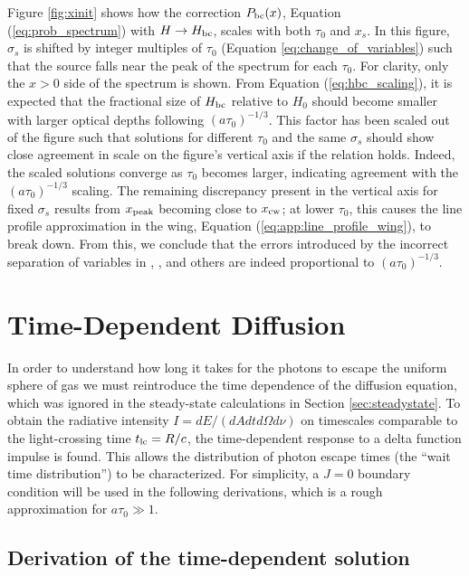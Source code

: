 \documentclass[linenumbers]{aastex63}
\begin{document}
Figure \ref{fig:xinit} shows how the correction $P_{\rm bc}(x)$, Equation (\ref{eq:prob_spectrum}) with $H \rightarrow H_{\rm bc}$, scales with both $\tau_0$ and $x_s$. In this figure, $\sigma_s$ is shifted by integer multiples of $\tau_0$ (Equation \ref{eq:change_of_variables}) such that the source falls near the peak of the spectrum for each $\tau_0$. For clarity, only the $x > 0$ side of the spectrum is shown. From Equation (\ref{eq:hbc_scaling}), it is expected that the fractional size of $H_{\rm bc}$ relative to $H_0$ should become smaller with larger optical depths following $(a\tau_0)^{-1/3}$. This factor has been scaled out of the figure such that solutions for different $\tau_0$ and the same $\sigma_s$ should show close agreement in scale on the figure's vertical axis if the relation holds. Indeed, the scaled solutions converge as $\tau_0$ becomes larger, indicating agreement with the $(a\tau_0)^{-1/3}$ scaling. The remaining discrepancy present in the vertical axis for fixed $\sigma_s$ results from $x_{\rm peak}$ becoming close to $x_{\rm cw}$; at lower $\tau_0$, this causes the line profile approximation in the wing, Equation (\ref{eq:app:line_profile_wing}), to break down. From this, we conclude that the errors introduced by the incorrect separation of variables in \citet{1973MNRAS.162...43H}, \citet{1990ApJ...350..216N}, \citet{2006ApJ...649...14D} and others are indeed proportional to $(a\tau_0)^{-1/3}$.

\section{Time-Dependent Diffusion}
\label{sec:time_dependent}

In order to understand how long it takes for the photons to escape the uniform sphere of gas we must reintroduce the time dependence of the diffusion equation, which was ignored in the steady-state calculations in Section \ref{sec:steadystate}. To obtain the radiative intensity $I=dE/(dAdtd\Omega d\nu)$ on timescales comparable to the light-crossing time $t_{\rm lc} = R/c$, the time-dependent response to a delta function impulse is found. This allows the distribution of photon escape times (the ``wait time distribution'') to be characterized. For simplicity, a $J=0$ boundary condition will be used in the following derivations, which is a rough approximation for $a\tau_0 \gg 1$. 

\subsection{Derivation of the time-dependent solution}
\label{subsec:time_dependent:background}
\end{document}
